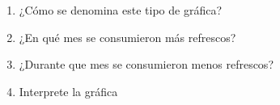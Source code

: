 \documentclass[letterpaper,fleqn]{article}
\begin{document}
\begin{enumerate}
\begin{minipage}{.55\textwidth}
\end{minipage}
\begin{enumerate}
\item ¿Cómo se denomina este tipo de gráfica?\noanswer
\item ¿En qué mes se consumieron más refrescos?\noanswer
\item ¿Durante que mes se consumieron menos refrescos?\noanswer
\item Interprete la gráfica\noanswer
\end{enumerate}
 \end{enumerate}
\end{document}
